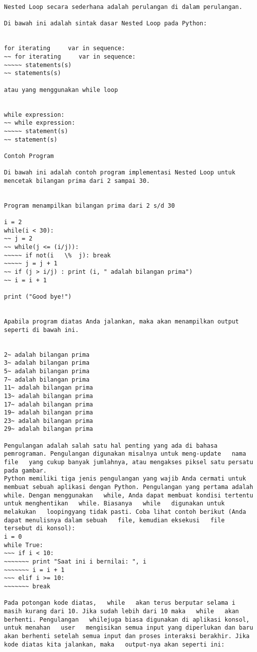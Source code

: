 \begin{verbatim}
Nested Loop secara sederhana adalah perulangan di dalam perulangan.

Di bawah ini adalah sintak dasar Nested Loop pada Python:

 
for iterating     var in sequence: 
~~ for iterating     var in sequence: 
~~~~~ statements(s) 
~~ statements(s) 

atau yang menggunakan while loop

 
while expression: 
~~ while expression: 
~~~~~ statement(s) 
~~ statement(s) 

Contoh Program

Di bawah ini adalah contoh program implementasi Nested Loop untuk mencetak bilangan prima dari 2 sampai 30.

 
Program menampilkan bilangan prima dari 2 s/d 30 

i = 2 
while(i < 30): 
~~ j = 2 
~~ while(j <= (i/j)): 
~~~~~ if not(i   \%  j): break 
~~~~~ j = j + 1 
~~ if (j > i/j) : print (i, " adalah bilangan prima") 
~~ i = i + 1 

print ("Good bye!") 


Apabila program diatas Anda jalankan, maka akan menampilkan output seperti di bawah ini.

 
2~ adalah bilangan prima 
3~ adalah bilangan prima 
5~ adalah bilangan prima 
7~ adalah bilangan prima 
11~ adalah bilangan prima 
13~ adalah bilangan prima 
17~ adalah bilangan prima 
19~ adalah bilangan prima 
23~ adalah bilangan prima 
29~ adalah bilangan prima 

Pengulangan adalah salah satu hal penting yang ada di bahasa pemrograman. Pengulangan digunakan misalnya untuk meng-update   nama   file   yang cukup banyak jumlahnya, atau mengakses piksel satu persatu pada gambar. 
Python memiliki tiga jenis pengulangan yang wajib Anda cermati untuk membuat sebuah aplikasi dengan Python. Pengulangan yang pertama adalah   while. Dengan menggunakan   while, Anda dapat membuat kondisi tertentu untuk menghentikan   while. Biasanya   while   digunakan untuk melakukan   loopingyang tidak pasti. Coba lihat contoh berikut (Anda dapat menulisnya dalam sebuah   file, kemudian eksekusi   file   tersebut di konsol): 
i = 0 
while True: 
~~~ if i < 10: 
~~~~~~~ print "Saat ini i bernilai: ", i 
~~~~~~~ i = i + 1 
~~~ elif i >= 10: 
~~~~~~~ break 

Pada potongan kode diatas,   while   akan terus berputar selama i masih kurang dari 10. Jika sudah lebih dari 10 maka   while   akan berhenti. Pengulangan   whilejuga biasa digunakan di aplikasi konsol, untuk menahan   user   mengisikan semua input yang diperlukan dan baru akan berhenti setelah semua input dan proses interaksi berakhir. Jika kode diatas kita jalankan, maka   output-nya akan seperti ini: 


\end{verbatim}
